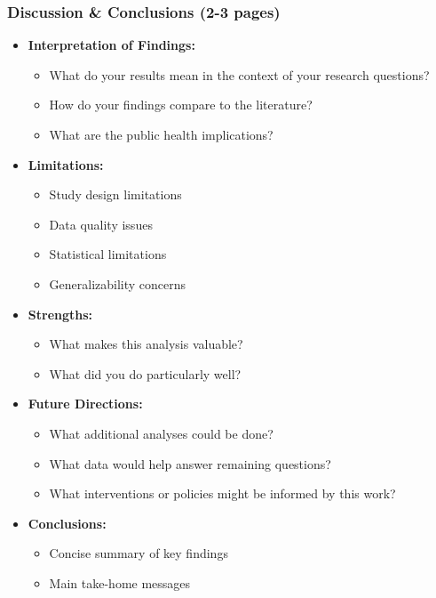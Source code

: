 \documentclass[11pt]{article}
\begin{document}
\subsubsection{Discussion \& Conclusions (2-3 pages)}

\begin{itemize}
\item \textbf{Interpretation of Findings:}
  \begin{itemize}
  \item What do your results mean in the context of your research questions?
  \item How do your findings compare to the literature?
  \item What are the public health implications?
  \end{itemize}

\item \textbf{Limitations:}
  \begin{itemize}
  \item Study design limitations
  \item Data quality issues
  \item Statistical limitations
  \item Generalizability concerns
  \end{itemize}

\item \textbf{Strengths:}
  \begin{itemize}
  \item What makes this analysis valuable?
  \item What did you do particularly well?
  \end{itemize}

\item \textbf{Future Directions:}
  \begin{itemize}
  \item What additional analyses could be done?
  \item What data would help answer remaining questions?
  \item What interventions or policies might be informed by this work?
  \end{itemize}

\item \textbf{Conclusions:}
  \begin{itemize}
  \item Concise summary of key findings
  \item Main take-home messages
  \end{itemize}
\end{itemize}
\end{document}
